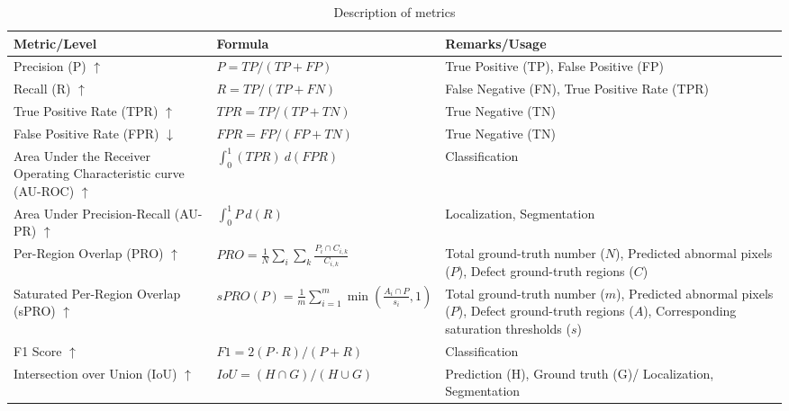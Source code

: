 \begin{table}[htbp]
    \tiny
    \centering
    \begin{tabularx}{\textwidth}{|X|X|X|}%
        \hline
        \textbf{Metric/Level} & \textbf{Formula} & \textbf{Remarks/Usage} \\
        \hline
        Precision (P) $\uparrow$ & $P = TP/(TP + FP)$ & True Positive (TP), False Positive (FP) \\
        \hline
        Recall (R) $\uparrow$ & $R = TP/(TP + FN)$ & False Negative (FN), True Positive Rate (TPR) \\
        \hline
        True Positive Rate (TPR) $\uparrow$ & $TPR = TP/(TP + TN)$ & True Negative (TN) \\
        \hline
        False Positive Rate (FPR) $\downarrow$ & $FPR = FP/(FP + TN)$ & True Negative (TN) \\
        \hline
        Area Under the Receiver Operating Characteristic curve (AU-ROC) $\uparrow$ & $ \int_{0}^{1} (TPR) \: d(FPR)$ & Classification \\
        \hline
        Area Under Precision-Recall (AU-PR) $\uparrow$ & $\int_{0}^{1} P \: d(R)$ & Localization, Segmentation \\
        \hline
        Per-Region Overlap (PRO) $\uparrow$ & $PRO = \frac{1}{N} \sum_{i} \sum_{k} \frac{P_i \cap C_{i,k}}{C_{i,k}}$ & Total ground-truth number (\(N\)), Predicted abnormal pixels (\(P\)), Defect ground-truth regions (\(C\)) \\
        \hline
        Saturated Per-Region Overlap (sPRO) $\uparrow$ & $sPRO(P) = \frac{1}{m} \sum_{i=1}^{m} \min(\frac{A_i \cap P}{s_i}, 1)$ & Total ground-truth number (\(m\)), Predicted abnormal pixels (\(P\)), Defect ground-truth regions (\(A\)), Corresponding saturation thresholds (\(s\)) \\
        \hline
        F1 Score $\uparrow$ & $F1 = 2(P \cdot R)/(P + R)$ & Classification \\
        \hline
        Intersection over Union (IoU) $\uparrow$ & $IoU = (H \cap G)/(H \cup G)$ & Prediction (H), Ground truth (G)/ Localization, Segmentation \\
        \hline
    \end{tabularx}
    \caption{Description of metrics}
    \label{tab:metrics}
\end{table}